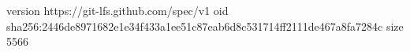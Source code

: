 version https://git-lfs.github.com/spec/v1
oid sha256:2446de8971682e1e34f433a1ee51c87eab6d8c531714ff2111de467a8fa7284c
size 5566
